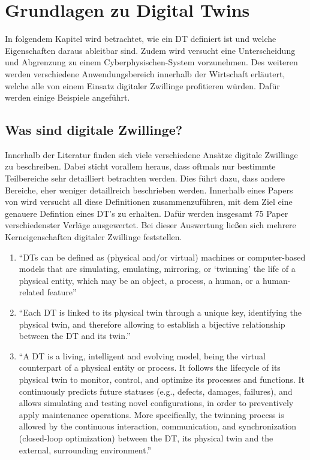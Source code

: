 \chapter{Grundlagen zu Digital Twins}

In folgendem Kapitel wird betrachtet, wie ein \ac{DT} definiert ist und welche Eigenschaften daraus ableitbar sind. Zudem wird versucht eine Unterscheidung und Abgrenzung zu einem Cyberphysischen-System vorzunehmen. Des weiteren werden verschiedene Anwendungsbereich innerhalb der Wirtschaft erläutert, welche alle von einem Einsatz digitaler Zwillinge profitieren würden. Dafür werden einige Beispiele angeführt.

\section{Was sind digitale Zwillinge?}

Innerhalb der Literatur finden sich viele verschiedene Ansätze digitale Zwillinge zu beschreiben. Dabei sticht vorallem heraus, dass oftmals nur bestimmte Teilbereiche sehr detailliert betrachten werden. Dies  führt dazu, dass andere Bereiche, eher weniger detaillreich beschrieben werden. Innerhalb eines Papers von \citeauthor{barricelli2019survey} wird versucht all diese Definitionen zusammenzuführen, mit dem Ziel eine genauere Defintion eines \ac{DT}'s zu erhalten. Dafür werden insgesamt 75 Paper verschiedenster Verläge ausgewertet.\autocite[S. 4, Kapitel 4]{barricelli2019survey} Bei dieser Auswertung ließen sich mehrere Kerneigenschaften digitaler Zwillinge feststellen.\autocite[\ppno~108953]{fuller2020digital}

\begin{enumerate}
    \item \enquote{\ac{DT}s can be deﬁned as (physical and/or virtual) machines or computer-based models that are simulating, emulating, mirroring, or \enquote{twinning} the life of a physical entity, which may be an object, a process, a human, or a human-related feature}
    \item \enquote{Each DT is linked to its physical twin through a unique key, identifying the physical twin, and therefore allowing to establish a bijective relationship between the DT and its twin.}
    \item \enquote{A DT is a living, intelligent and evolving model, being the virtual counterpart of a physical entity or process. It follows the lifecycle of its physical twin to monitor, control, and optimize its processes and functions. It continuously predicts future statuses (e.g., defects, damages, failures), and allows simulating and testing novel conﬁgurations, in order to preventively apply maintenance operations. More speciﬁcally, the twinning process is allowed by the continuous interaction, communication, and synchronization (closed-loop optimization) between the DT, its physical twin and the external, surrounding environment.}
\end{enumerate}

